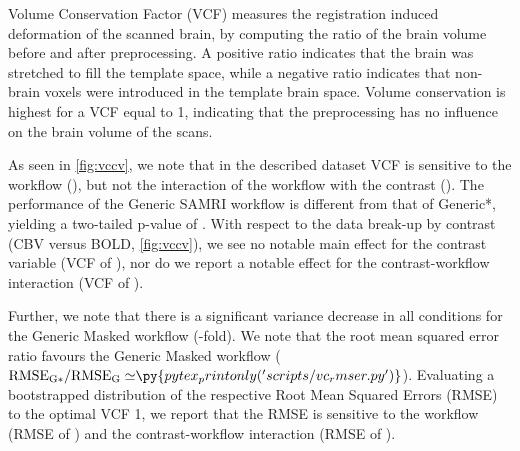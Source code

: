 Volume Conservation Factor (VCF) \cite{ioanas_optimized_2019} measures the registration induced deformation of the scanned brain, by computing the ratio of the brain volume before and after preprocessing.
A positive ratio indicates that the brain was stretched to fill the template space, while a negative ratio indicates that non-brain voxels were introduced in the template brain space.
Volume conservation is highest for a VCF equal to 1, indicating that the preprocessing has no influence on the brain volume of the scans.

As seen in \cref{fig:vccv}, we note that in the described dataset VCF is sensitive to the workflow
(),
but not the interaction of the workflow with the contrast ().
The performance of the Generic SAMRI workflow is different from that of Generic*, yielding a two-tailed p-value of .
With respect to the data break-up by contrast (CBV versus BOLD, \cref{fig:vccv}), we see no notable main effect for the contrast variable
(VCF of ), nor do we report a notable effect for the contrast-workflow interaction (VCF of ).

Further, we note that there is a significant variance decrease in all conditions for the Generic Masked workflow
(-fold).
We note that the root mean squared error ratio favours the Generic Masked workflow
($\mathrm{RMSE_{G*}/RMSE_{G}\simeq} \py{pytex_printonly('scripts/vc_rmser.py')}$).
Evaluating a bootstrapped distribution of the respective Root Mean Squared Errors (RMSE) to the optimal VCF 1, we report that the RMSE is sensitive to the
workflow (RMSE of )
and the contrast-workflow interaction (RMSE of ).

